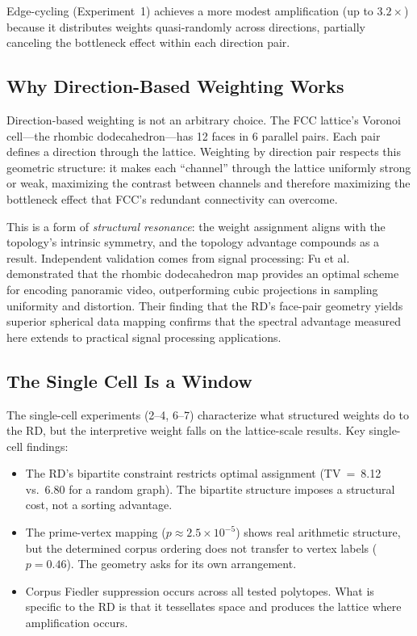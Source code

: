 \documentclass[11pt]{article}
\begin{document}
Edge-cycling (Experiment~1) achieves a more modest amplification
(up to $3.2\times$) because it distributes weights quasi-randomly
across directions, partially canceling the bottleneck effect within
each direction pair.

\subsection{Why Direction-Based Weighting Works}

Direction-based weighting is not an arbitrary choice. The FCC
lattice's Voronoi cell---the rhombic dodecahedron---has 12 faces
in 6 parallel pairs. Each pair defines a direction through the
lattice. Weighting by direction pair respects this geometric
structure: it makes each ``channel'' through the lattice uniformly
strong or weak, maximizing the contrast between channels and
therefore maximizing the bottleneck effect that FCC's redundant
connectivity can overcome.

This is a form of \emph{structural resonance}: the weight
assignment aligns with the topology's intrinsic symmetry, and the
topology advantage compounds as a result. Independent validation
comes from signal processing: Fu et al.~\cite{fu2009rhombic}
demonstrated that the rhombic dodecahedron map provides an optimal
scheme for encoding panoramic video, outperforming cubic projections
in sampling uniformity and distortion. Their finding that the RD's
face-pair geometry yields superior spherical data mapping confirms
that the spectral advantage measured here extends to practical
signal processing applications.

\subsection{The Single Cell Is a Window}

The single-cell experiments (2--4, 6--7) characterize what
structured weights do to the RD, but the interpretive weight falls
on the lattice-scale results. Key single-cell findings:

\begin{itemize}
  \item The RD's bipartite constraint restricts optimal assignment
    (TV~=~8.12 vs.\ 6.80 for a random graph). The bipartite
    structure imposes a structural cost, not a sorting advantage.
  \item The prime-vertex mapping ($p \approx 2.5 \times 10^{-5}$) shows real
    arithmetic structure, but the determined corpus ordering does
    not transfer to vertex labels ($p = 0.46$). The geometry asks
    for its own arrangement.
  \item Corpus Fiedler suppression occurs across all tested polytopes.
    What is specific to the RD is that it tessellates space and
    produces the lattice where amplification occurs.
\end{itemize}
\end{document}
